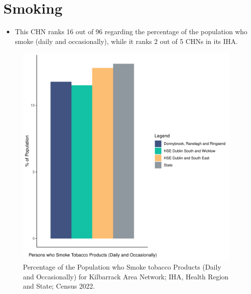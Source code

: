 \documentclass{article}
\begin{document}
\pagebreak

\section{Smoking}\label{sect:Smoking}
\begin{itemize}
\item This CHN ranks  16 out of 96 regarding the percentage of the population who smoke (daily and occasionally), while it ranks   2 out of 5 CHNs in its IHA.
\end{itemize}
\begin{figure}[H]
	\centering
	\includegraphics[width = 120mm]{../figures/SmokingED.pdf}
	\caption{Percentage of the Population who Smoke tobacco Products (Daily and Occasionally) for Kilbarrack Area Network; IHA, Health Region and State; Census 2022.}
	\label{fig:2ae19629-1a6a-13a3-e055-000000000001}
	\end{figure}
	
\end{document}
